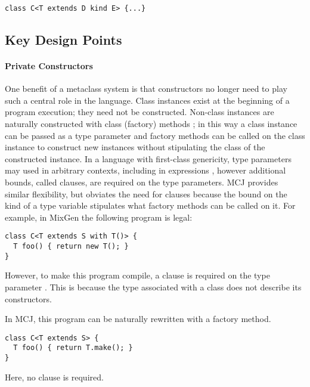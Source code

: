 \documentclass[10pt]{acm-sigplan}
\begin{document}
\begin{verbatim}
class C<T extends D kind E> {...}
\end{verbatim}


\subsection{Key Design Points}

\paragraph{Private Constructors}
\label{privconst}

One benefit of a metaclass system is that constructors no longer need
to play such a central role in the language. Class instances exist at
the beginning of a program execution; they need not be constructed.
Non-class instances are naturally constructed with class (factory)
methods \cite{GOF}; in this way a class instance can be passed as a
type parameter and factory methods can be called on the class instance
to construct new instances without stipulating the class of the
constructed instance.  In a language with first-class genericity, type
parameters may used in arbitrary contexts, including in 
expressions \cite{NextGen, MixGen}, however additional bounds, called
 clauses, are required on the type parameters.  MCJ provides
similar flexibility, but obviates the need for {} clauses
because the bound on the kind of a type variable stipulates what
factory methods can be called on it.
\newpage
For example, in MixGen \cite{MixGen} the following program is legal:

\begin{verbatim}
class C<T extends S with T()> {
  T foo() { return new T(); }
}
\end{verbatim}

However, to make this program compile, a  clause is required
on the type parameter .  This is because the type associated
with a class does not describe its constructors.  

In MCJ, this program can be naturally rewritten with a factory method.

\begin{verbatim}
class C<T extends S> {
  T foo() { return T.make(); }
}
\end{verbatim}

Here, no  clause is required.  
\end{document}

